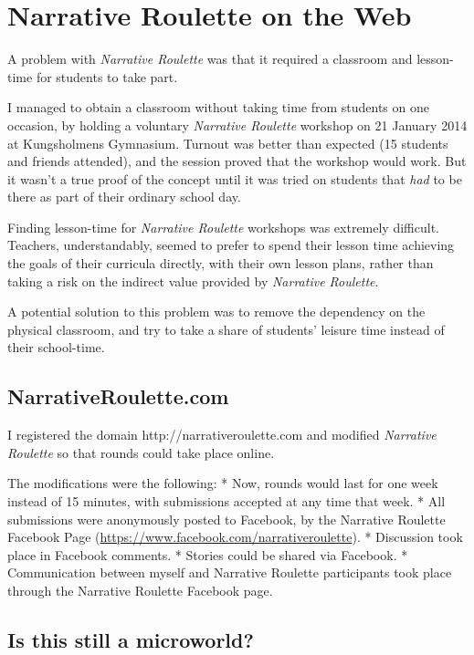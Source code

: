 \section{Narrative Roulette on the Web}

A problem with \emph{Narrative Roulette} was that it required a
classroom and lesson-time for students to take part.

I managed to obtain a classroom without taking time from students on one
occasion, by holding a voluntary \emph{Narrative Roulette} workshop on
21 January 2014 at Kungsholmens Gymnasium. Turnout was better than
expected (15 students and friends attended), and the session proved that
the workshop would work. But it wasn't a true proof of the concept until
it was tried on students that \emph{had} to be there as part of their
ordinary school day.

Finding lesson-time for \emph{Narrative Roulette} workshops was
extremely difficult. Teachers, understandably, seemed to prefer to spend
their lesson time achieving the goals of their curricula directly, with
their own lesson plans, rather than taking a risk on the indirect value
provided by \emph{Narrative Roulette}.

A potential solution to this problem was to remove the dependency on the
physical classroom, and try to take a share of students' leisure time
instead of their school-time.

\subsection{NarrativeRoulette.com}

I registered the domain http://narrativeroulette.com and modified
\emph{Narrative Roulette} so that rounds could take place online.

The modifications were the following: * Now, rounds would last for one
week instead of 15 minutes, with submissions accepted at any time that
week. * All submissions were anonymously posted to Facebook, by the
Narrative Roulette Facebook Page
(\href{https://www.facebook.com/narrativeroulette}{https://www.facebook.com/narrativeroulette}).
* Discussion took place in Facebook comments. * Stories could be shared
via Facebook. * Communication between myself and Narrative Roulette
participants took place through the Narrative Roulette Facebook page.

\subsection{Is this still a microworld?}

